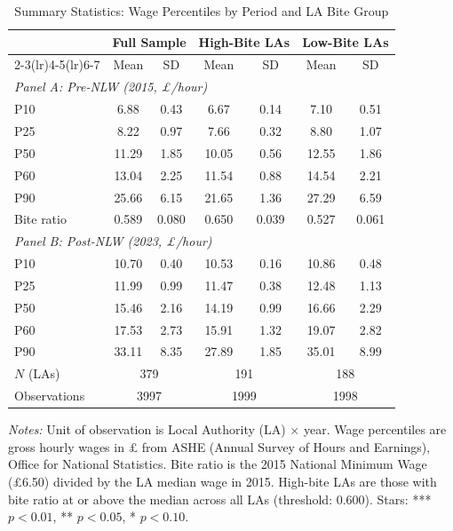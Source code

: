 \begin{table}[htbp]
\centering
\caption{Summary Statistics: Wage Percentiles by Period and LA Bite Group}
\label{tab:summary}
\small
\begin{tabular}{lcccccc}
\hline\hline
 & \multicolumn{2}{c}{Full Sample} & \multicolumn{2}{c}{High-Bite LAs} & \multicolumn{2}{c}{Low-Bite LAs} \\
\cmidrule(lr){2-3}\cmidrule(lr){4-5}\cmidrule(lr){6-7}
 & Mean & SD & Mean & SD & Mean & SD \\
\hline
\multicolumn{7}{l}{\textit{Panel A: Pre-NLW (2015, £/hour)}} \\
\quad P10 & 6.88 & 0.43 & 6.67 & 0.14 & 7.10 & 0.51 \\
\quad P25 & 8.22 & 0.97 & 7.66 & 0.32 & 8.80 & 1.07 \\
\quad P50 & 11.29 & 1.85 & 10.05 & 0.56 & 12.55 & 1.86 \\
\quad P60 & 13.04 & 2.25 & 11.54 & 0.88 & 14.54 & 2.21 \\
\quad P90 & 25.66 & 6.15 & 21.65 & 1.36 & 27.29 & 6.59 \\
\quad Bite ratio & 0.589 & 0.080 & 0.650 & 0.039 & 0.527 & 0.061 \\
\hline
\multicolumn{7}{l}{\textit{Panel B: Post-NLW (2023, £/hour)}} \\
\quad P10 & 10.70 & 0.40 & 10.53 & 0.16 & 10.86 & 0.48 \\
\quad P25 & 11.99 & 0.99 & 11.47 & 0.38 & 12.48 & 1.13 \\
\quad P50 & 15.46 & 2.16 & 14.19 & 0.99 & 16.66 & 2.29 \\
\quad P60 & 17.53 & 2.73 & 15.91 & 1.32 & 19.07 & 2.82 \\
\quad P90 & 33.11 & 8.35 & 27.89 & 1.85 & 35.01 & 8.99 \\
\quad $N$ (LAs) & \multicolumn{2}{c}{379} & \multicolumn{2}{c}{191} & \multicolumn{2}{c}{188} \\
\quad Observations & \multicolumn{2}{c}{3997} & \multicolumn{2}{c}{1999} & \multicolumn{2}{c}{1998} \\
\hline\hline
\end{tabular}
\raggedright\footnotesize\textit{Notes:} Unit of observation is Local Authority (LA) $\times$ year. Wage percentiles are gross hourly wages in £ from ASHE (Annual Survey of Hours and Earnings), Office for National Statistics. Bite ratio is the 2015 National Minimum Wage (£6.50) divided by the LA median wage in 2015. High-bite LAs are those with bite ratio at or above the median across all LAs (threshold: 0.600). Stars: *** $p<0.01$, ** $p<0.05$, * $p<0.10$.
\end{table}
